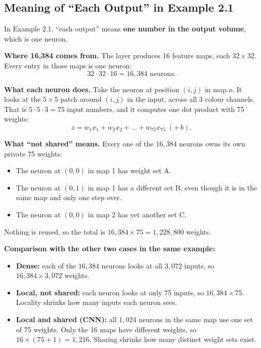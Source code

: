 \subsection*{Meaning of ``Each Output'' in Example 2.1}

In Example 2.1, ``each output'' means \textbf{one number in the output volume}, which is one neuron.

\textbf{Where 16,384 comes from.} The layer produces 16 feature maps, each $32\times32$. Every entry in those maps is one neuron:
\[
32 \cdot 32 \cdot 16 = 16{,}384 \text{ neurons.}
\]

\textbf{What each neuron does.} Take the neuron at position $(i,j)$ in map $o$. It looks at the $5\times5$ patch around $(i,j)$ in the input, across all 3 colour channels. That is $5\cdot5\cdot3 = 75$ input numbers, and it computes one dot product with 75 weights:
\[
z = w_1x_1 + w_2x_2 + \dots + w_{75}x_{75} \;(+\,b).
\]

\textbf{What ``not shared'' means.} Every one of the $16{,}384$ neurons owns its own private 75 weights:
\begin{itemize}[leftmargin=*]
  \item The neuron at $(0,0)$ in map 1 has weight set A.
  \item The neuron at $(0,1)$ in map 1 has a different set B, even though it is in the same map and only one step over.
  \item The neuron at $(0,0)$ in map 2 has yet another set C.
\end{itemize}
Nothing is reused, so the total is $16{,}384 \times 75 = 1{,}228{,}800$ weights.

\textbf{Comparison with the other two cases in the same example:}
\begin{itemize}[leftmargin=*]
  \item \textbf{Dense:} each of the $16{,}384$ neurons looks at all $3{,}072$ inputs, so $16{,}384 \times 3{,}072$ weights.
  \item \textbf{Local, not shared:} each neuron looks at only 75 inputs, so $16{,}384 \times 75$. Locality shrinks how many inputs each neuron sees.
  \item \textbf{Local and shared (CNN):} all $1{,}024$ neurons in the same map use one set of 75 weights. Only the 16 maps have different weights, so $16 \times (75+1) = 1{,}216$. Sharing shrinks how many distinct weight sets exist.
\end{itemize}

